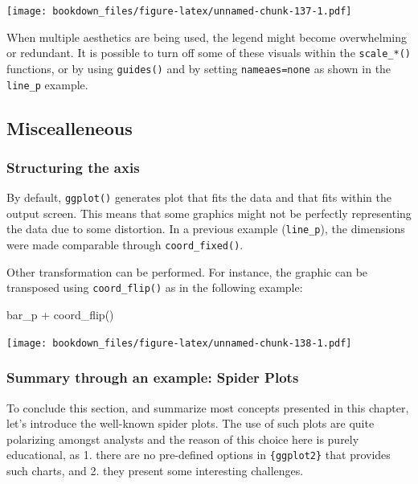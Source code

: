 \documentclass[
]{krantz}
\makeatletter
\newenvironment{Shaded}{\begin{snugshade}}{\end{snugshade}}
\newcommand{\FunctionTok}[1]{\textcolor[rgb]{0,0,0}{#1}}
\newcommand{\NormalTok}[1]{#1}
\newcommand{\SpecialCharTok}[1]{\textcolor[rgb]{0,0,0}{#1}}
\newenvironment{kframe}{%
\medskip{}
\setlength{\fboxsep}{.8em}
 \def\at@end@of@kframe{}%
 \ifinner\ifhmode%
  \def\at@end@of@kframe{\end{minipage}}%
  \begin{minipage}{\columnwidth}%
 \fi\fi%
 \def\FrameCommand##1{\hskip\@totalleftmargin \hskip-\fboxsep
 \colorbox{shadecolor}{##1}\hskip-\fboxsep
     \hskip-\linewidth \hskip-\@totalleftmargin \hskip\columnwidth}%
 \MakeFramed {\advance\hsize-\width
   \@totalleftmargin\z@ \linewidth\hsize
   \@setminipage}}%
 {\par\unskip\endMakeFramed%
 \at@end@of@kframe}
\renewenvironment{Shaded}{\begin{kframe}}{\end{kframe}}
\makeatother
\begin{document}
\texttt{[image: bookdown\_files/figure-latex/unnamed-chunk-137-1.pdf]}

When multiple aesthetics are being used, the legend might become overwhelming or redundant. It is possible to turn off some of these visuals within the \texttt{scale\_*()} functions, or by using \texttt{guides()} and by setting \texttt{nameaes=\textquotesingle{}none\textquotesingle{}} as shown in the \texttt{line\_p} example.

\hypertarget{miscealleneous}{%
\subsection{Miscealleneous}\label{miscealleneous}}

\hypertarget{structuring-the-axis}{%
\subsubsection{Structuring the axis}\label{structuring-the-axis}}

By default, \texttt{ggplot()} generates plot that fits the data and that fits within the output screen. This means that some graphics might not be perfectly representing the data due to some distortion. In a previous example (\texttt{line\_p}), the dimensions were made comparable through \texttt{coord\_fixed()}.

Other transformation can be performed. For instance, the graphic can be transposed using \texttt{coord\_flip()} as in the following example:

\begin{Shaded}
\begin{Highlighting}[]
\NormalTok{bar\_p }\SpecialCharTok{+} \FunctionTok{coord\_flip}\NormalTok{()}
\end{Highlighting}
\end{Shaded}

\texttt{[image: bookdown\_files/figure-latex/unnamed-chunk-138-1.pdf]}

\hypertarget{summary-through-an-example-spider-plots}{%
\subsubsection{Summary through an example: Spider Plots}\label{summary-through-an-example-spider-plots}}

To conclude this section, and summarize most concepts presented in this chapter, let's introduce the well-known spider plots. The use of such plots are quite polarizing amongst analysts and the reason of this choice here is purely educational, as 1. there are no pre-defined options in \texttt{\{ggplot2\}} that provides such charts, and 2. they present some interesting challenges.
\end{document}
